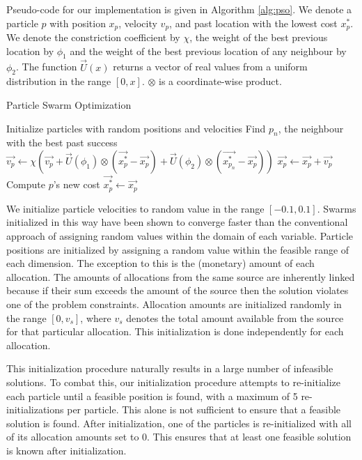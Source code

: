 \documentclass{sig-alternate}
\begin{document}
Pseudo-code for our implementation is given in Algorithm \ref{alg:pso}. We denote a particle $p$ with position $x_p$, velocity $v_p$, and past location with the lowest cost $x^*_p$. We denote the constriction coefficient by $\chi$, the weight of the best previous location by $\phi_1$ and the weight of the best previous location of any neighbour by $\phi_2$. The function $\vec{U}(x)$ returns a vector of real values from a uniform distribution in the range $[0, x]$. $\otimes$ is a coordinate-wise product.

\begin{algorithm}
\caption{Particle Swarm Optimization} \label{alg:pso}
\begin{algorithmic}[1]
	\State Initialize particles with random positions and velocities
			\State Find $p_n$, the neighbour with the best past success
			\State $\vec{v_p} \gets \chi(\vec{v_p} + \vec{U}(\phi_1) \otimes (\vec{x^*_p} - \vec{x_p}) + \vec{U}(\phi_2) \otimes (\vec{x^*_{p_n}} - \vec{x_p}))$
		\EndFor
			\State $\vec{x_p} \gets \vec{x_p} + \vec{v_p}$
				\State Compute $p$'s new cost
					\State $\vec{x^*_p} \gets \vec{x_p}$
				\EndIf
			\EndIf
		\EndFor
	\EndFor
\end{algorithmic}
\end{algorithm}

We initialize particle velocities to random value in the range $[-0.1, 0.1]$. Swarms initialized in this way have been shown to converge faster than the conventional approach of assigning random values within the domain of each variable\cite{Engelbrecht2012}. Particle positions are initialized by assigning a random value within the feasible range of each dimension. The exception to this is the (monetary) amount of each allocation.
The amounts of allocations from the same source are inherently linked because if their sum exceeds the amount of the source then the solution violates one of the problem constraints. Allocation amounts are initialized randomly in the range $[0, v_s]$, where $v_s$ denotes the total amount available from the source for that particular allocation. This initialization is done independently for each allocation.

This initialization procedure naturally results in a large number of infeasible solutions. To combat this, our initialization procedure attempts to re-initialize each particle until a feasible position is found, with a maximum of 5 re-initializations per particle. This alone is not sufficient to ensure that a feasible solution is found. After initialization, one of the particles is re-initialized with all of its allocation amounts set to 0. This ensures that at least one feasible solution is known after initialization.
\end{document}
